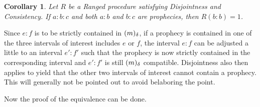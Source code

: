\documentclass[12pt]{article}
\newtheorem{corollary}{Corollary}[section]
\begin{document}
\begin{corollary}
    Let $R$ be a Ranged procedure satisfying Disjointness and Consistency. If $a:b:c$ and both $a:b$ and $b:c$ are prophecies, then $R(b:b)=1$.
\end{corollary}


Since $e:f$ is to be strictly contained in $(m)_{\delta}$, if a prophecy is contained in one of the three intervals of interest includes $e$ or $f$, the interval $e:f$ can be adjusted a little to an interval $e':f'$ such that the prophecy is now strictly contained in the corresponding interval and $e':f'$ is still  $(m)_{\delta}$ compatible. Disjointness also then applies to yield that the other two intervals of interest cannot contain a prophecy. This will generally not be pointed out to avoid belaboring the point. 

Now the proof of the equivalence can be done. 
\end{document}
